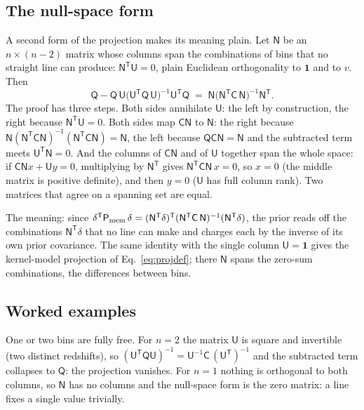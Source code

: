 \documentclass[11pt]{article}
\newcommand{\ones}{\mathbf{1}} %
\newcommand{\Cov}{\mathsf{C}}
\newcommand{\Prec}{\mathsf{P}}
\newcommand{\T}{^{\mathsf{T}}}
\begin{document}
\subsection{The null-space form}

A second form of the projection makes its meaning plain.  Let
$\mathsf{N}$ be an $n \times (n-2)$ matrix whose columns span the
combinations of bins that no straight line can produce:
$\mathsf{N}\T \mathsf{U} = 0$, plain Euclidean orthogonality to
$\ones$ and to $v$.  Then
\begin{equation}
  \mathsf{Q} - \mathsf{Q}\,\mathsf{U}
  \bigl(\mathsf{U}\T \mathsf{Q}\,\mathsf{U}\bigr)^{-1}
  \mathsf{U}\T \mathsf{Q}
  \;=\;
  \mathsf{N}
  \bigl(\mathsf{N}\T \Cov\, \mathsf{N}\bigr)^{-1}
  \mathsf{N}\T .
  \label{eq:memnull}
\end{equation}
The proof has three steps.  Both sides annihilate $\mathsf{U}$: the
left by construction, the right because
$\mathsf{N}\T\mathsf{U} = 0$.  Both sides map $\Cov\mathsf{N}$ to
$\mathsf{N}$: the right because
$\mathsf{N}(\mathsf{N}\T\Cov\mathsf{N})^{-1}
(\mathsf{N}\T\Cov\mathsf{N}) = \mathsf{N}$, the left because
$\mathsf{Q}\Cov\mathsf{N} = \mathsf{N}$ and the subtracted term
meets $\mathsf{U}\T\mathsf{N} = 0$.  And the columns of
$\Cov\mathsf{N}$ and of $\mathsf{U}$ together span the whole space:
if $\Cov\mathsf{N}x + \mathsf{U}y = 0$, multiplying by
$\mathsf{N}\T$ gives $\mathsf{N}\T\Cov\mathsf{N}\,x = 0$, so
$x = 0$ (the middle matrix is positive definite), and then $y = 0$
($\mathsf{U}$ has full column rank).  Two matrices that agree on a
spanning set are equal.

The meaning: since
$\delta\T \Prec_{\rm mem}\,\delta =
(\mathsf{N}\T\delta)\T (\mathsf{N}\T \Cov\,\mathsf{N})^{-1}
(\mathsf{N}\T\delta)$, the prior reads off the combinations
$\mathsf{N}\T\delta$ that no line can make and charges each by the
inverse of its own prior covariance.  The same identity with the
single column $\mathsf{U} = \ones$ gives the kernel-model projection
of Eq.~\eqref{eq:projdef}; there $\mathsf{N}$ spans the zero-sum
combinations, the differences between bins.

\subsection{Worked examples}

One or two bins are fully free.  For $n = 2$ the matrix $\mathsf{U}$
is square and invertible (two distinct redshifts), so
$(\mathsf{U}\T\mathsf{Q}\mathsf{U})^{-1} =
\mathsf{U}^{-1}\Cov\,(\mathsf{U}\T)^{-1}$ and the subtracted term
collapses to $\mathsf{Q}$: the projection vanishes.  For $n = 1$
nothing is orthogonal to both columns, so $\mathsf{N}$ has no
columns and the null-space form is the zero matrix: a line fixes a
single value trivially.
\end{document}
